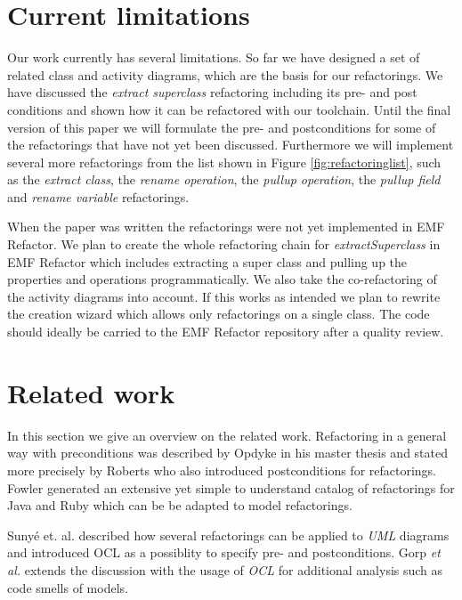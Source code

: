 \documentclass{llncs}
\begin{document}
\section{Current limitations}
\label{sec:limitations}
Our work currently has several limitations. So far we have designed a set of related class and activity diagrams,
which are the basis for our refactorings. We have discussed the \textit{extract superclass} refactoring including its
pre- and post conditions and shown how it can be refactored with our toolchain. Until the final version of this
paper we will formulate the pre- and postconditions for some of the refactorings that have not yet been discussed.
Furthermore we will implement several more refactorings from the list shown in Figure \ref{fig:refactoringlist}, such as the
\textit{extract class}, the \textit{rename operation}, the \textit{pullup operation}, the \textit{pullup field} and 
\textit{rename variable} refactorings.

When the paper was written the refactorings were not yet implemented in EMF Refactor.
We plan to create the whole refactoring chain for \textit{extractSuperclass} in EMF Refactor which includes extracting 
a super class and pulling up the properties and operations programmatically. We also take the co-refactoring of the activity 
diagrams into account. If this works as intended we plan to rewrite the creation wizard which allows only refactorings 
on a single class. The code should ideally be carried to the EMF Refactor repository after a quality review.

\section{Related work}
\label{sec:relatedwork}

In this section we give an overview on the related work. Refactoring in a general way with preconditions was described
by Opdyke \cite{mast:REFOOF} in his master thesis and stated more precisely by Roberts \cite{rob99} who also introduced
postconditions for refactorings. Fowler \cite{fow99} generated an extensive yet simple to understand catalog of
refactorings for Java and Ruby which can be be adapted to model refactorings.


Suny{\'e} et. al. \cite{DBLP:conf/uml/SunyePTJ01} described how several refactorings can be applied to \textit{UML}
diagrams and introduced OCL as a possiblity to specify pre- and postconditions. Gorp \textit{et al.} \cite{gorp03} extends the
discussion with the usage of \textit{OCL} for additional analysis such as code smells of models.
\end{document}
